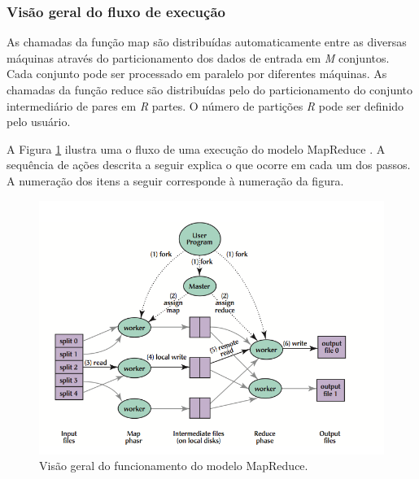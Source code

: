 
\subsubsection{Visão geral do fluxo de execução}


As chamadas da função map são distribuídas automaticamente entre as diversas máquinas através do particionamento dos dados de entrada em \textit{M} conjuntos. Cada conjunto pode ser processado em paralelo por diferentes máquinas. As chamadas da função reduce são distribuídas pelo do particionamento do conjunto intermediário de pares em \textit{R} partes. O número de partições \textit{R} pode ser definido pelo usuário.

A Figura \ref{fig:mapreduceoverview} ilustra uma o fluxo de uma execução do modelo MapReduce \cite{Dean:2008}. A sequência de ações descrita a seguir explica o que ocorre em cada um dos passos. A numeração dos itens a seguir corresponde à numeração da figura.



 \begin{figure}[htb]
 \centering
\includegraphics[scale=.65]{figuras/MapReduceOverview.png}
\caption{Visão geral do funcionamento do modelo MapReduce.}
\label{fig:mapreduceoverview}
\end{figure}




